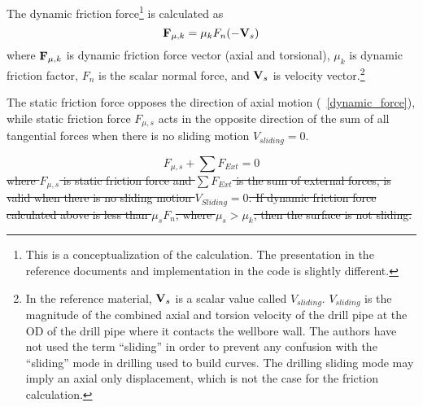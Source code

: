 The dynamic friction force\footnote{This is a conceptualization of the calculation. The presentation in the reference documents and implementation in the code is slightly different.} is calculated as
\begin{equation}\label{dynamic_force}
  \mbox{\boldmath$\mathrm{F}$}_{\mu,k} = \mu_{k} F_{n} (-\mbox{\boldmath$\mathrm{V}$}_{s})
\end{equation}
where $\mbox{\boldmath$\mathrm{F}$}_{\mu,k}$ is dynamic friction force vector (axial and torsional), $\mu_k$ is dynamic friction factor, $F_n$ is the scalar normal force, and $\mbox{\boldmath$\mathrm{V}$}_{s}$ is velocity vector.\footnote{In the reference material, $\mbox{\boldmath$\mathrm{V}$}_{s}$ is a scalar value called $V_{sliding}$. $V_{sliding}$ is the magnitude of the combined axial and torsion velocity of the drill pipe at the OD of the drill pipe where it contacts the wellbore wall.  The authors have not used the term ``sliding'' in order to prevent any confusion with the ``sliding'' mode in drilling used to build curves.  The drilling sliding mode may imply an axial only displacement, which is not the case for the friction calculation.}


The static friction force opposes the direction of axial motion (\equationname~\ref{dynamic_force}), while static friction force $F_{\mu,s}$ acts in the opposite direction of the sum of all tangential forces when there is no sliding motion $V_{sliding}=0$.

\begin{equation}\label{zero}
  F_{\mu,s} + \sum F_{Ext} = 0
\end{equation}
\sout{
where $F_{\mu,s}$ is static friction force and $\sum F_{Ext}$ is the sum of external forces, is valid when there is no sliding motion $V_{Sliding}=0$.
If dynamic friction force calculated above is less than $\mu_{s} F_{n}$, where $\mu_{s} > \mu_{k}$, then the surface is not sliding.}

